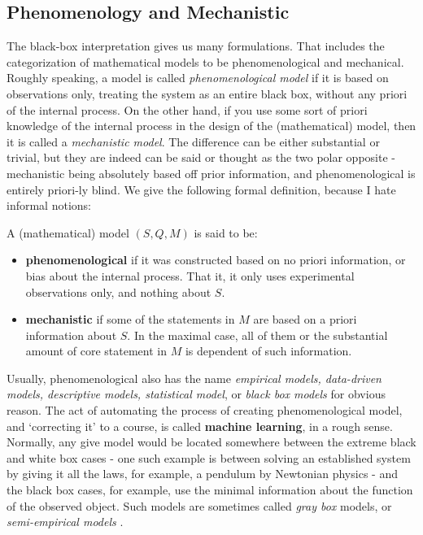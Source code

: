 \subsection{Phenomenology and Mechanistic}
The black-box interpretation gives us many formulations. That includes the categorization of mathematical models to be phenomenological and mechanical. Roughly speaking, a model is called \textit{phenomenological model}  if it is based on observations only, treating the system as an entire black box, without any priori of the internal process. On the other hand, if you use some sort of priori knowledge of the internal process in the design of the (mathematical) model, then it is called a \textit{mechanistic model}. The difference can be either substantial or trivial, but they are indeed can be said or thought as the two polar opposite - mechanistic being absolutely based off prior information, and phenomenological is entirely priori-ly blind. We give the following formal definition, because I hate informal notions: 
\begin{definition}
    A (mathematical) model $(S,Q,M)$ is said to be: 
    \begin{itemize}
        \item \textbf{phenomenological} if it was constructed based on no priori information, or bias about the internal process. That it, it only uses experimental observations only, and nothing about $S$. 
        \item \textbf{mechanistic} if some of the statements in $M$ are based on a priori information about $S$. In the maximal case, all of them or the substantial amount of core statement in $M$ is dependent of such information. 
    \end{itemize}
\end{definition}

Usually, phenomenological also has the name \textit{empirical models, data-driven models, descriptive models, statistical model}, or \textit{black box models} for obvious reason. The act of automating the process of creating phenomenological model, and `correcting it' to a course, is called \textbf{machine learning}, in a rough sense. Normally, any give model would be located somewhere between the extreme black and white box cases - one such example is between solving an established system by giving it all the laws, for example, a pendulum by Newtonian physics - and the black box cases, for example, use the minimal information about the function of the observed object. Such models are sometimes called \textit{gray box} models, or \textit{semi-empirical models} . 


